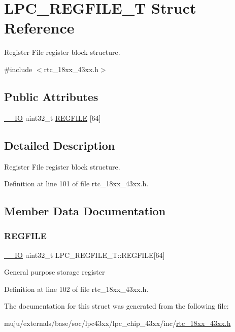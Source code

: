 \hypertarget{struct_l_p_c___r_e_g_f_i_l_e___t}{}\section{L\+P\+C\+\_\+\+R\+E\+G\+F\+I\+L\+E\+\_\+T Struct Reference}
\label{struct_l_p_c___r_e_g_f_i_l_e___t}


Register File register block structure.  




{\ttfamily \#include $<$rtc\+\_\+18xx\+\_\+43xx.\+h$>$}

\subsection*{Public Attributes}
\begin{DoxyCompactItemize}
\item 
\hyperlink{core__sc300_8h_aec43007d9998a0a0e01faede4133d6be}{\+\_\+\+\_\+\+IO} uint32\+\_\+t \hyperlink{struct_l_p_c___r_e_g_f_i_l_e___t_a2ae159494a63fe9b6d5c2efacb7543f5}{R\+E\+G\+F\+I\+LE} \mbox{[}64\mbox{]}
\end{DoxyCompactItemize}


\subsection{Detailed Description}
Register File register block structure. 

Definition at line 101 of file rtc\+\_\+18xx\+\_\+43xx.\+h.



\subsection{Member Data Documentation}
\mbox{\label{struct_l_p_c___r_e_g_f_i_l_e___t_a2ae159494a63fe9b6d5c2efacb7543f5}} 
\subsubsection{\texorpdfstring{R\+E\+G\+F\+I\+LE}{REGFILE}}
{\footnotesize\ttfamily \hyperlink{core__sc300_8h_aec43007d9998a0a0e01faede4133d6be}{\+\_\+\+\_\+\+IO} uint32\+\_\+t L\+P\+C\+\_\+\+R\+E\+G\+F\+I\+L\+E\+\_\+\+T\+::\+R\+E\+G\+F\+I\+LE\mbox{[}64\mbox{]}}

General purpose storage register 

Definition at line 102 of file rtc\+\_\+18xx\+\_\+43xx.\+h.



The documentation for this struct was generated from the following file\+:\begin{DoxyCompactItemize}
\item 
muju/externals/base/soc/lpc43xx/lpc\+\_\+chip\+\_\+43xx/inc/\hyperlink{rtc__18xx__43xx_8h}{rtc\+\_\+18xx\+\_\+43xx.\+h}\end{DoxyCompactItemize}
